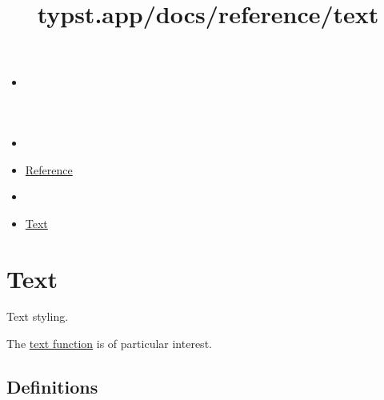 \title{typst.app/docs/reference/text}

\begin{itemize}
\tightlist
\item
  \href{/docs}{}
\item
  
\item
  \href{/docs/reference/}{Reference}
\item
  
\item
  \href{/docs/reference/text/}{Text}
\end{itemize}

\section{Text}\label{summary}

Text styling.

The \href{/docs/reference/text/text/}{text function} is of particular
interest.

\subsection{Definitions}\label{definitions}

